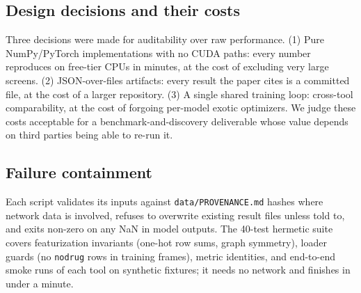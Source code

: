\subsection{Design decisions and their costs}
Three decisions were made for auditability over raw performance. (1) Pure
NumPy/PyTorch implementations with no CUDA paths: every number reproduces on
free-tier CPUs in minutes, at the cost of excluding very large screens.
(2) JSON-over-files artifacts: every result the paper cites is a committed
file, at the cost of a larger repository. (3) A single shared training loop:
cross-tool comparability, at the cost of forgoing per-model exotic
optimizers. We judge these costs acceptable for a benchmark-and-discovery
deliverable whose value depends on third parties being able to re-run it.

\subsection{Failure containment}
Each script validates its inputs against \texttt{data/PROVENANCE.md} hashes
where network data is involved, refuses to overwrite existing result files
unless told to, and exits non-zero on any NaN in model outputs. The 40-test
hermetic suite covers featurization invariants (one-hot row sums, graph
symmetry), loader guards (no \texttt{nodrug} rows in training frames),
metric identities, and end-to-end smoke runs of each tool on synthetic
fixtures; it needs no network and finishes in under a minute.
